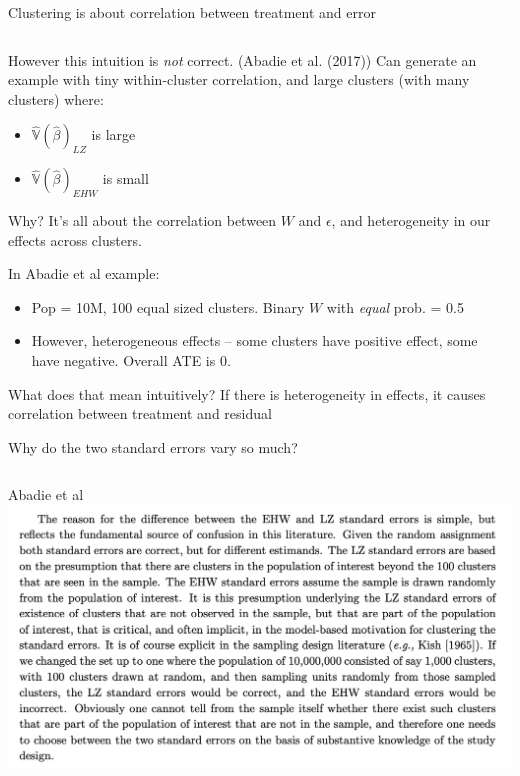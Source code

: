 \documentclass[notes,11pt, aspectratio=169]{beamer}
\newenvironment{wideitemize}{\itemize\addtolength{\itemsep}{10pt}}{\enditemize}
\begin{document}
\begin{frame}{Clustering is about correlation between treatment and error}
\begin{columns}[T] %
\begin{column}{.8\textwidth}
  \begin{wideitemize}
  \item However this intuition is \emph{not} correct.  (Abadie et
    al. (2017)) Can generate an example with tiny within-cluster
    correlation, and large clusters (with many clusters) where:
    \begin{itemize}
    \item $\hat{\mathbb{V}}(\hat{\beta})_{LZ}$ is large
    \item $\hat{\mathbb{V}}(\hat{\beta})_{EHW}$ is small
    \end{itemize}
  \item Why? It's all about the correlation between $W$ and
    $\epsilon$, and heterogeneity in our effects across clusters.
  \item In Abadie et al example:
    \begin{itemize}
    \item Pop = 10M, 100 equal sized clusters. Binary $W$ with
      \emph{equal} prob. = 0.5
    \item However, heterogeneous effects -- some clusters have
      positive effect, some have negative. Overall ATE is 0.
    \end{itemize}
  \item What does that mean intuitively? If there is heterogeneity in
    effects, it causes correlation between treatment and residual
  \item Why do the two standard errors vary so much? 
  \end{wideitemize}
  \end{column}%
  \hfill%
  \begin{column}{.5\textwidth}
  \end{column}
\end{columns}
\end{frame}

\begin{frame}{Abadie et al}
  \includegraphics[width=\linewidth]{abadiecluster.png}
\end{frame}
\end{document}
